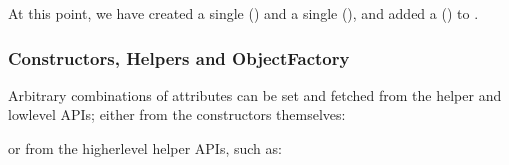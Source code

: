 \documentclass[letterpaper,10pt,english]{sphinxmanual}
\renewcommand{\sphinxcode}[1]{\texttt{\small{#1}}}
\begin{document}
At this point, we have created a single \sphinxcode{} (\sphinxcode{})
and a single \sphinxcode{} (\sphinxcode{}),
and added a \sphinxcode{} (\sphinxcode{}) to \sphinxcode{}.


\subsubsection{Constructors, Helpers and ObjectFactory}
\label{\detokenize{attributes:constructors-helpers-and-objectfactory}}
Arbitrary combinations of attributes can be set and fetched from
the helper and low\sphinxhyphen{}level APIs; either from the constructors themselves:

\begin{sphinxVerbatim}[commandchars=\\\{\}]
  
      
       
       
       
       
       
\end{sphinxVerbatim}

or from the higher\sphinxhyphen{}level helper APIs, such as:
\end{document}
